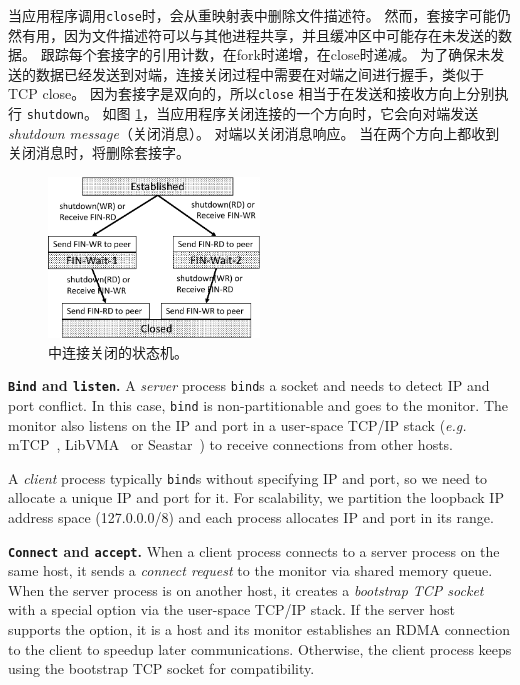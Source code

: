 当应用程序调用\texttt {close}时，\libipc {}会从重映射表中删除文件描述符。
然而，套接字可能仍然有用，因为文件描述符可以与其他进程共享，并且缓冲区中可能存在未发送的数据。
\libipc{} 跟踪每个套接字的引用计数，在fork时递增，在close时递减。
为了确保未发送的数据已经发送到对端，连接关闭过程中需要在对端之间进行握手，类似于TCP close。
因为套接字是双向的，所以\texttt {close} 相当于在发送和接收方向上分别执行 \texttt {shutdown}。
如图 \ref{socksdirect:fig:conn-close}，当应用程序关闭连接的一个方向时，它会向对端发送 \emph {shutdown message}（关闭消息）。
对端以关闭消息响应。
当\libipc {}在两个方向上都收到关闭消息时，将删除套接字。


\begin{figure}[htbp]
	\centering
	\includegraphics[width=0.5\textwidth]{images/conn-close-new}	
	\caption{\libipc{} 中连接关闭的状态机。}
	\label{socksdirect:fig:conn-close}
\end{figure}


\iffalse

\textbf{\texttt{Bind} and \texttt{listen}.}
A \emph{server} process \texttt{bind}s a socket and needs to detect IP and port conflict. In this case, \texttt{bind} is non-partitionable and goes to the monitor. The monitor also listens on the IP and port in a user-space TCP/IP stack (\textit{e.g.} mTCP~\cite{jeong2014mtcp}, LibVMA~\cite{libvma} or Seastar~\cite{seastar}) to receive connections from other hosts.

A \emph{client} process typically \texttt{bind}s without specifying IP and port, so we need to allocate a unique IP and port for it. For scalability, we partition the loopback IP address space (127.0.0.0/8) and each process allocates IP and port in its range.

\textbf{\texttt{Connect} and \texttt{accept}.}
When a client process connects to a server process on the same host, it sends a \textit{connect request} to the monitor via shared memory queue. When the server process is on another host, it creates a \textit{bootstrap TCP socket} with a special option via the user-space TCP/IP stack. If the server host supports the option, it is a \sys host and its monitor establishes an RDMA connection to the client to speedup later communications. Otherwise, the client process keeps using the bootstrap TCP socket for compatibility.

